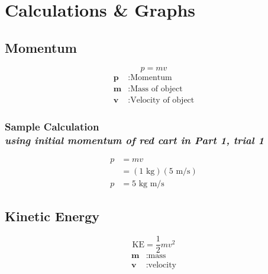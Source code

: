 
\section{Calculations \& Graphs}

\vspace{-0.5cm}
\singlespacing


\subsection{Momentum} 

{\centering
\begin{equation}
	p = mv 
	\label{eq:momentum}
\end{equation}
\begin{align*}
	\mathbf{p} &: \text{Momentum} \\
	\mathbf{m} &: \text{Mass of object} \\
	\mathbf{v} &: \text{Velocity of object} 
\end{align*}}

\subsubsection{Sample Calculation \\ {\normalfont \small\textit{using initial momentum of red cart in Part 1, trial 1}}}

{\centering
\begin{align*}
	p &=  mv \\
		&=  (1 \text{ kg})(5 \text{ m/s}) \\ 
	p &= \boxed{5 \text{ kg m/s}} 
\end{align*}}


\subsection{Kinetic Energy} 

{\centering
\begin{equation}
	\text{KE} = \frac{1}{2}mv^2 
	\label{eq:energyK}
\end{equation}
\begin{align*}
	\boldsymbol{m} &: \text{mass} \\
	\boldsymbol{v} &: \text{velocity} 
\end{align*}}

